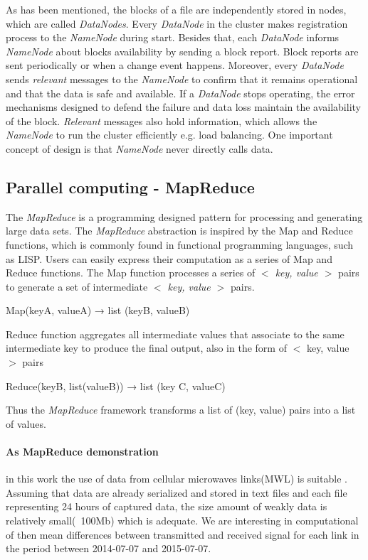 \documentclass[a4paper,12pt,oneside]{report}
\begin{document}
As has been mentioned, the blocks of a file are independently stored in nodes, which are called
\textit{DataNodes}. Every \textit{DataNode} in the cluster makes registration process to the \textit{NameNode} during start. 
Besides that, each \textit{DataNode} informs \textit{NameNode} about blocks availability by sending a block report. 
Block reports are sent periodically or when a change event happens. Moreover, every \textit{DataNode} sends 
\emph{relevant} messages to the \textit{NameNode} to confirm that
it remains operational and that the data is safe and available. If a \textit{DataNode} stops operating, the error 
mechanisms designed to defend the failure and data loss maintain the availability of the block.
\emph{Relevant} messages also hold information, which allows the \textit{NameNode} to run the cluster efficiently e.g. 
load balancing. One important concept of design  is that \textit{NameNode} never directly calls data.
		

	\subsection{Parallel computing - MapReduce}		
The \emph{MapReduce} is a programming designed pattern for processing and generating large data
sets. The \emph{MapReduce} abstraction is inspired by the Map and Reduce functions, which is commonly
found in functional programming languages, such as LISP. Users can easily express their
computation as a series of Map and Reduce functions. The Map function processes a series of
\textit{$<$ key, value $>$} pairs to generate a set of intermediate \textit{$<$ key, value $>$} pairs.

\begin{center}
Map(keyA, valueA) → list (keyB, valueB)
\end{center}
Reduce function aggregates all intermediate values that associate to the same intermediate key
to produce the final output, also in the form of $<$ key, value $>$ pairs
\begin{center}
Reduce(keyB, list(valueB)) → list (key C, valueC)
\end{center}
Thus the \emph{MapReduce} framework transforms a list of (key, value) pairs into a list of values. 


\paragraph{As MapReduce demonstration} in this work the use of data from cellular microwaves links(MWL)  is suitable . 
Assuming that data are already serialized and stored in text files and each file representing 24 hours of captured data, the size amount of weakly data is relatively small(~100Mb) which is adequate.
We are interesting in computational of then  mean differences between transmitted and received signal for each link in the period between 2014-07-07 and 2015-07-07.
\end{document}
